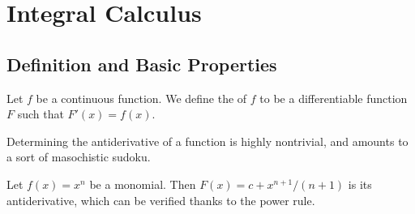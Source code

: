 \chapter{Integral Calculus}

\section{Definition and Basic Properties}

\begin{definition}\label{calculus:integral-0000}%
Let $f$ be a continuous function. We define the 
of $f$ to be a differentiable function $F$ such that $F'(x)=f(x)$.

Determining the antiderivative of a function is highly nontrivial, and
amounts to a sort of masochistic sudoku.

\begin{example}\label{calculus:integral-0001}%
Let $f(x)=x^{n}$ be a monomial. Then $F(x)=c+x^{n+1}/(n+1)$ is its
antiderivative, which can be verified thanks to the power rule.
\end{example}
\end{definition}

